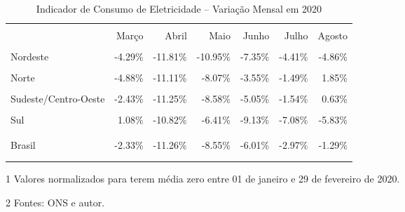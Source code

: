 \documentclass[12pt]{article}
\begin{document}
\begin{table}[!htbp]
	\centering
	\caption{Indicador de Consumo de Eletricidade -- Variação Mensal em 2020}
	\label{tab:table1}
	\begin{threeparttable}[!htbp]
		\begin{tabular}{lrrrrrr}
			\\[-0.75em] \toprule \\[-1em]
			{} &  Março &  Abril &  Maio &  Junho &  Julho &  Agosto \\
			\midrule \\[-1em]
			Nordeste             &       -4.29\% &      -11.81\% &      -10.95\% &       -7.35\% &       -4.41\% &       -4.86\% \\ \\[-1em]
			Norte                 &       -4.88\% &      -11.11\% &       -8.07\% &       -3.55\% &       -1.49\% &        1.85\% \\ \\[-1em]
			Sudeste/Centro-Oeste &       -2.43\% &      -11.25\% &       -8.58\% &       -5.05\% &       -1.54\% &        0.63\% \\ \\[-1em]
			Sul                 &        1.08\% &      -10.82\% &       -6.41\% &       -9.13\% &       -7.08\% &       -5.83\% \\ \\[-1em] \hdashline[2pt/3pt] \\[-0.75em]
			Brasil                &       -2.33\% &      -11.26\% &       -8.55\% &       -6.01\% &       -2.97\% &       -1.29\% \\ \\[-1em]
			\bottomrule \\[-0.75em]
		\end{tabular}
		\begin{tablenotes}
			\item[1] \small Valores normalizados para terem média zero entre 01 de janeiro e 29 de fevereiro de 2020.
			\item[2] \small Fontes: ONS e autor.
		\end{tablenotes}
	\end{threeparttable}
\end{table} 
\end{document}
